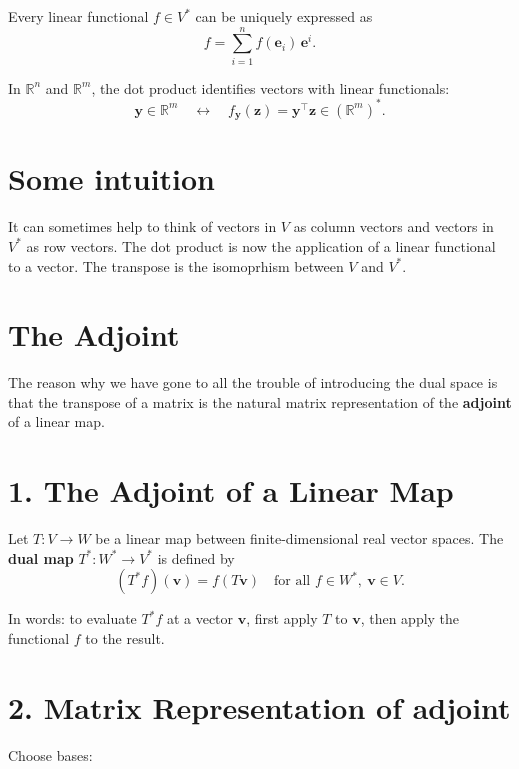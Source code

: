 \documentclass[11pt]{article}
\begin{document}
    Every linear functional $ f \in V^* $ can be uniquely expressed as
    \[
    f = \sum_{i=1}^n f(\mathbf{e}_i) \, \mathbf{e}^i.
    \]



In $ \mathbb{R}^n $ and $ \mathbb{R}^m $, the dot product identifies vectors with linear functionals:
\[
\mathbf{y} \in \mathbb{R}^m \quad \longleftrightarrow \quad f_{\mathbf{y}}(\mathbf{z}) = \mathbf{y}^\top \mathbf{z} \in (\mathbb{R}^m)^*.
\]







\section*{Some intuition}

It can sometimes help to think of vectors in $V$ as column vectors and vectors in $V^*$ as row vectors. The dot product is now the application of a linear functional to a vector. The transpose is the isomoprhism between $V$ and $V^*$.



\section*{The Adjoint}

The reason why we have gone to all the trouble of introducing the dual space is that the transpose of a matrix is the natural matrix representation of the \textbf{adjoint} of a linear map. 

\section*{1. The Adjoint of a Linear Map}

Let $ T: V \to W $ be a linear map between finite-dimensional real vector spaces.  
The \textbf{dual map} $ T^*: W^* \to V^* $ is defined by
\[
(T^* f)(\mathbf{v}) = f(T\mathbf{v}) \quad \text{for all } f \in W^*,\ \mathbf{v} \in V.
\]

In words: to evaluate $ T^* f $ at a vector $ \mathbf{v} $, first apply $ T $ to $ \mathbf{v} $, then apply the functional $ f $ to the result.  

\section*{2. Matrix Representation of adjoint}

Choose bases:
\end{document}
